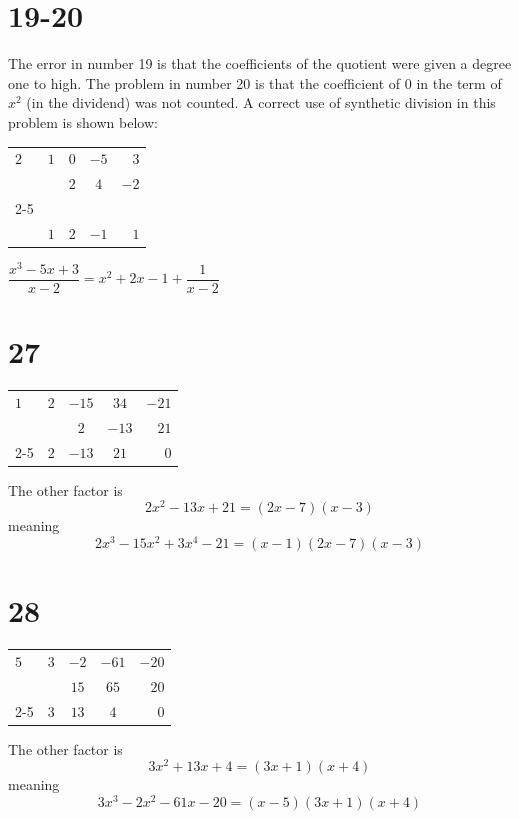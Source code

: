 \documentclass{article}
\theoremstyle{definition}
\renewcommand{\arraystretch}{1}
\begin{document}
\renewcommand{\arraystretch}{0.5}
\section*{19-20}
The error in number 19 is that the coefficients of the quotient were given a degree one to high. The problem in number 20 is that the coefficient of 
$0$ in the term of $x^2$ (in the dividend) was not counted. A correct use of synthetic division in this problem is shown below:
\FloatBarrier
	\begin{center}
		\begin{tabular}{l|cccr}
			$2$ & $1$ & $0$ & $-5$ & $3$ \\
			& & $2$ & $4$ & $-2$ \\[-3.75pt]
			\cmidrule{2-5} \\
			& $1$ & $2$ & $-1$ & $1$
		\end{tabular}
	\end{center}
\FloatBarrier
$\dfrac{x^3-5x+3}{x-2}=x^2+2x-1+\dfrac{1}{x-2}$

\newpage
\renewcommand{\arraystretch}{1}
\section*{27}
\FloatBarrier
	\begin{center}
		\begin{tabular}{l|cccr}
			$1$ & $2$ & $-15$ & $34$ & $-21$ \\
			& & $2$ & $-13$ & $21$ \\[-4.75pt]
			\cmidrule{2-5}
			& $2$ & $-13$ & $21$ & $0$
		\end{tabular}
	\end{center}
\FloatBarrier
The other factor is \[ 2x^2-13x+21=(2x-7)(x-3) \]
meaning \[ 2x^3-15x^2+3x^4-21=(x-1)(2x-7)(x-3) \]

\section*{28}
\FloatBarrier
	\begin{center}
		\begin{tabular}{l|cccr}
			$5$ & $3$ & $-2$ & $-61$ & $-20$ \\
			& & $15$ & $65$ & $20$ \\[-4.75pt]
			\cmidrule{2-5}
			& $3$ & $13$ & $4$ & $0$
		\end{tabular}
	\end{center}
\FloatBarrier
The other factor is \[ 3x^2+13x+4=(3x+1)(x+4)\]
meaning \[ 3x^3-2x^2-61x-20=(x-5)(3x+1)(x+4) \]
\end{document}
